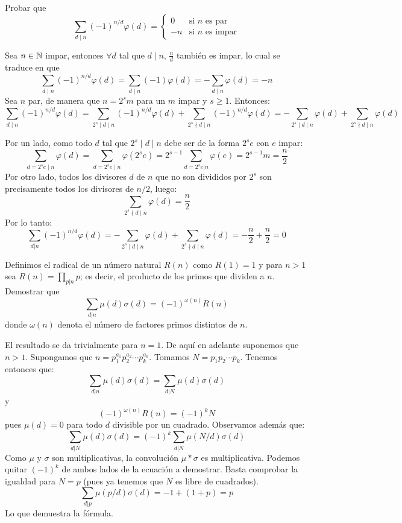 \documentclass[twoside]{article}
\begin{document}
\begin{ejercicio}{13}
Probar que	
\[
\sum_{d\mid n} (-1)^{n/d}\varphi(d) = 
\begin{cases}
0 & \text{si $n$ es par}\\ 
-n & \text{si $n$ es impar}
\end{cases}
\]
\begin{sol}
Sea $n \in \mathbb{N}$ impar, entonces $\forall d$ tal que $d \mid n$, $\frac{n}{d}$ también es impar, lo cual se traduce en que
\[
\sum_{d\mid n} (-1)^{n/d}\varphi(d) = \sum_{d\mid n} (-1)\varphi(d) = -\sum_{d\mid n}\varphi(d) = -n
\]
Sea $n$ par, de manera que $n=2^sm$ para un $m$ impar y $s ≥ 1$. Entonces:
\[ \sum_{d\mid n}(-1)^{n/d}φ(d) =  \sum_{2^s\mid d \mid n}(-1)^{n/d}φ(d) +  \sum_{2^s\nmid d \mid n}(-1)^{n/d}φ(d) = -\sum_{2^s\mid d \mid n}φ(d) + \sum_{2^s\nmid d \mid n}φ(d) \]

Por un lado, como todo $d$ tal que $2^s\mid d \mid n$ debe ser de la forma $2^se$ con $e$ impar:
\[ \sum_{d=2^se \mid n} φ(d) = \sum_{d=2^se \mid n} φ(2^se) = 2^{s-1}\sum_{d=2^se|n} φ(e) = 2^{s-1}m = \frac{n}{2}\]
Por otro lado, todos los divisores $d$ de $n$ que no son divididos por $2^s$ son precisamente todos los divisores de $n/2$, luego:
\[ \sum_{2^s\nmid d \mid n}φ(d) = \frac{n}{2} \]
Por lo tanto:
\[ \sum_{d|n} (-1)^{n/d}φ(d) = -\sum_{2^s\mid d\mid n}φ(d)+\sum_{2^s\nmid d\mid n}φ(d) = -\frac{n}{2}+\frac{n}{2}=0\]
\end{sol}

\newpage

\begin{ejercicio}{14}
Definimos el radical de un número natural $R(n)$ como $R(1) = 1$ y para $n > 1$ sea $R(n) = \prod_{p|n} p$; es decir, el producto de los primos que dividen a $n$. Demostrar que
\[ \sum_{d|n} μ(d) σ(d) = (-1)^{ω(n)} R(n) \]
donde $ω(n)$ denota el número de factores primos distintos de $n$.
\end{ejercicio}
\begin{solucion}
El resultado se da trivialmente para $n=1$. De aquí en adelante suponemos que $n>1$.
Supongamos que $n=p_1^{a_1}p_2^{a_2}\cdots p_k^{a_k}$. Tomamos $N=p_1p_2\cdots p_k$. Tenemos entonces que:
\[ \sum_{d|n} μ(d) σ(d) = \sum_{d|N} μ(d) σ(d) \]
y
\[ (-1)^{ω(n)} R(n) = (-1)^k N \]
pues $μ(d)=0$ para todo $d$ divisible por un cuadrado.
Observamos además que:
\[ \sum_{d|N} μ(d) σ(d) = (-1)^k\sum_{d|N} μ(N/d) σ(d) \]
Como $μ$ y $σ$ son multiplicativas, la convolución $μ * σ$ es multiplicativa. Podemos quitar $(-1)^{k}$ de ambos lados de la ecuación a demostrar. Basta comprobar la igualdad para $N=p$ (pues ya tenemos que $N$ es libre de cuadrados).
\[ \sum_{d|p} μ(p/d) σ(d) = -1+(1+p) = p \]
Lo que demuestra la fórmula.
\end{solucion}


\end{ejercicio}
\end{document}
